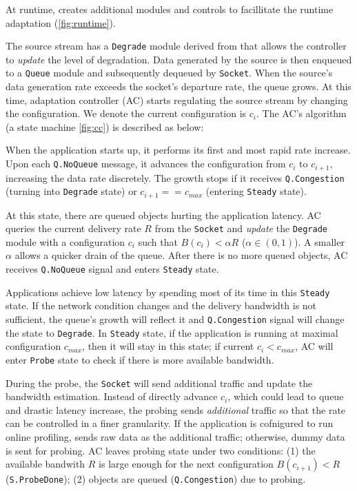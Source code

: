 At runtime, \sysname{} creates additional modules and controls to facillitate
the runtime adaptation (\autoref{fig:runtime}).

The source stream has a \texttt{Degrade} module derived from \maybe{} that
allows the controller to \textit{update} the level of degradation. Data
generated by the source is then enqueued to a \texttt{Queue} module and
subsequently dequeued by \texttt{Socket}. When the source's data generation rate
exceeds the socket's departure rate, the queue grows. At this time, adaptation
controller (AC) starts regulating the source stream by changing the
configuration. We denote the current configuration is $c_i$. The AC's algorithm
(a state machine \autoref{fig:cc}) is described as below:

 When the application starts up, it performs its
first and most rapid rate increase. Upon each \texttt{Q.NoQueue} message, it
advances the configuration from $c_i$ to $c_{i+1}$, increasing the data rate
discretely. The growth stops if it receives \texttt{Q.Congestion} (turning into
\texttt{Degrade} state) or $c_{i+1} == c_{max}$ (entering \texttt{Steady}
state).

 At this state, there are queued objects
hurting the application latency. AC queries the current delivery rate $R$ from
the \texttt{Socket} and \textit{update} the \texttt{Degrade} module with a
configuration $c_i$ such that $B(c_i) < \alpha R$ ($\alpha \in (0, 1)$). A
smaller $\alpha$ allows a quicker drain of the queue. After there is no more
queued objects, AC receives \texttt{Q.NoQueue} signal and enters \texttt{Steady}
state.

 Applications achieve low latency
by spending most of its time in this \texttt{Steady} state. If the network
condition changes and the delivery bandwidth is not sufficient, the queue's
growth will reflect it and \texttt{Q.Congestion} signal will change the state to
\texttt{Degrade}. In \texttt{Steady} state, if the application is running at
maximal configuration $c_{max}$, then it will stay in this state; if current
$c_i < c_{max}$, AC will enter \texttt{Probe} state to check if there is more
available bandwidth.

 During the probe, the
\texttt{Socket} will send additional traffic and update the bandwidth
estimation. Instead of directly advance $c_i$, which could lead to queue and
drastic latency increase, the probing sends \textit{additional} traffic so that
the rate can be controlled in a finer granularity. If the application is
cofnigured to run online profiling, \sysname{} sends raw data as the additional
traffic; otherwise, dummy data is sent for probing. AC leaves probing state
under two conditions: (1) the available bandwith $R$ is large enough for the
next configuration $B(c_{i+1}) < R$ (\texttt{S.ProbeDone}); (2) objects are
queued (\texttt{Q.Congestion}) due to probing.

